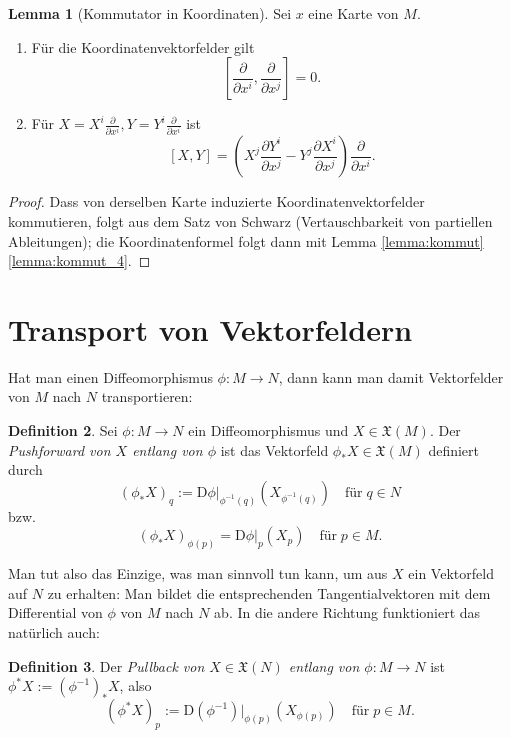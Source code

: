\documentclass[a4paper]{scrbook}
\numberwithin{equation}{chapter}
\newcommand{\DD}{\mathrm{D}}
\theoremstyle{definition}
\newtheorem{defn}{Definition}[section]
\newtheorem{lemma}[defn]{Lemma}
\begin{document}
\begin{lemma}[Kommutator in Koordinaten]
	Sei $x$ eine Karte von $M$.
	\begin{enumerate}[label=(\alph*)]
		\item Für die Koordinatenvektorfelder gilt
			\[\left[\frac{\partial}{\partial x^i}, \frac{\partial}{\partial x^j}\right] = 0.\]
		\item Für $X = X^i \frac{\partial}{\partial x^i}, Y = Y^i \frac{\partial}{\partial x^i}$ ist
			\[[X,Y] = \left(X^j\frac{\partial Y^i}{\partial x^j} - Y^j\frac{\partial X^i}{\partial x^j}\right) \frac{\partial}{\partial x^i}.\]
	\end{enumerate}

	\begin{proof}
		Dass von derselben Karte induzierte Koordinatenvektorfelder kommutieren, folgt aus dem Satz von Schwarz (Vertauschbarkeit von partiellen Ableitungen); die Koordinatenformel folgt dann mit Lemma \ref{lemma:kommut} \ref{lemma:kommut_4}.
	\end{proof}
\end{lemma}

\section{Transport von Vektorfeldern}
Hat man einen Diffeomorphismus $\phi\colon M\to N$, dann kann man damit Vektorfelder von $M$ nach $N$ \glqq transportieren\grqq:
\begin{defn}
	Sei $\phi\colon M \to N$ ein Diffeomorphismus und $X \in \mathfrak X(M)$. Der \emph{Pushforward von $X$ entlang von $\phi$} ist das Vektorfeld $\phi_*X \in \mathfrak X(M)$ definiert durch
	\[(\phi_*X)_q := \DD\phi|_{\phi^{-1}(q)}(X_{\phi^{-1}(q)}) \quad \text{für} \; q \in N\]
	bzw.
	\[(\phi_*X)_{\phi(p)} = \DD\phi|_{p}(X_p) \quad \text{für} \; p \in M.\]
\end{defn}
Man tut also das Einzige, was man sinnvoll tun kann, um aus $X$ ein Vektorfeld auf $N$ zu erhalten: Man bildet die entsprechenden Tangentialvektoren mit dem Differential von $\phi$ von $M$ nach $N$ ab. In die andere Richtung funktioniert das natürlich auch:
\begin{defn}
	Der \emph{Pullback von $X \in \mathfrak X(N)$ entlang von $\phi\colon M \to N$} ist $\phi^*X := (\phi^{-1})_*X$, also
	\[(\phi^*X)_p := \DD(\phi^{-1})|_{\phi(p)}(X_{\phi(p)}) \quad \text{für} \; p \in M.\]
\end{defn}
\end{document}
